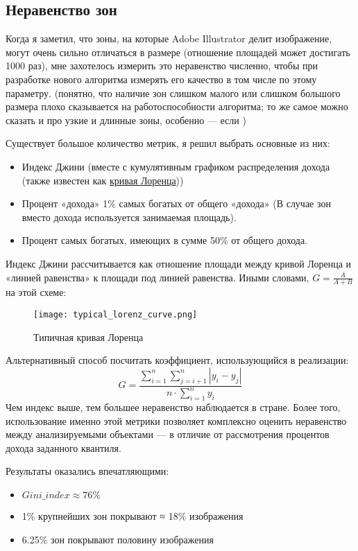 \subsection{Неравенство зон}\label{subsec:inequality}
Когда я заметил, что зоны, на которые Adobe Illustrator делит изображение, могут очень сильно отличаться в размере (отношение площадей может достигать 1000 раз),
мне захотелось измерить это неравенство численно, чтобы при разработке нового алгоритма измерять его качество в том числе по этому параметру.
(понятно, что наличие зон слишком малого или слишком большого размера плохо сказывается на работоспособности алгоритма;
то же самое можно сказать и про узкие и длинные зоны, особенно — если )

Существует большое количество метрик, я решил выбрать основные из них:
\begin{itemize}
    \item Индекс Джини (вместе с кумулятивным графиком распределения дохода (также известен как \href{https://en.wikipedia.org/wiki/Lorenz_curve}{кривая Лоренца}))
    \item Процент «дохода» 1\% самых богатых от общего «дохода» (В случае зон вместо дохода используется занимаемая площадь).
    \item Процент самых богатых, имеющих в сумме 50\% от общего дохода.
\end{itemize}

Индекс Джини рассчитывается как отношение площади между кривой Лоренца и «линией равенства» к площади под линией равенства.
Иными словами, $G = \frac{A}{A + B}$ на этой схеме:

\begin{figure}[h!]\label{fig:lorenz_curve}
    \centering
    \texttt{[image: typical\_lorenz\_curve.png]}
    \caption{Типичная кривая Лоренца}
\end{figure}
Альтернативный способ посчитать коэффициент, использующийся в реализации:
\begin{equation}
    G = \frac{\sum_{i=1}^{n}  \sum_{j=i+1}^{n}  \left| y_i - y_j \right|}{n \cdot \sum_{i=1}^{n} y_i}
\end{equation}
Чем индекс выше, тем большее неравенство наблюдается в стране.
Более того, использование именно этой метрики позволяет комплексно оценить неравенство между анализируемыми объектами —
в отличие от рассмотрения процентов дохода заданного квантиля.


Результаты оказались впечатляющими:
\begin{itemize}
    \item $Gini\_index \approx 76\%$
    \item 1\% крупнейших зон покрывают ≈ 18\% изображения
    \item 6.25\% зон покрывают половину изображения
\end{itemize}

